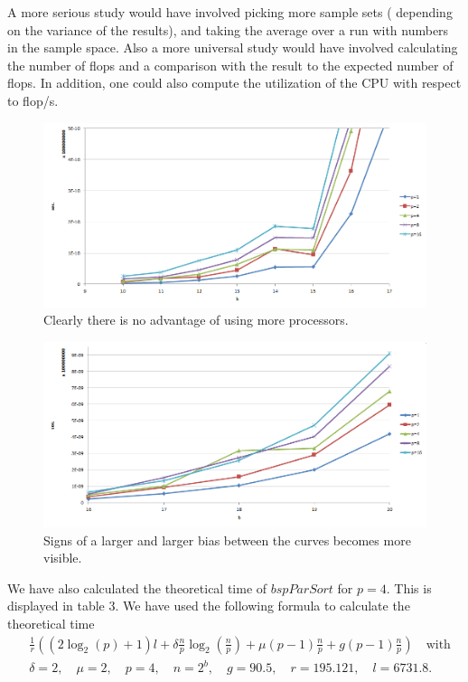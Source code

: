 \documentclass[a4paper,12pt,article]{memoir}
\theoremstyle{plain}
\theoremstyle{definition}
\theoremstyle{remark}
\theoremstyle{plain}
\theoremstyle{remark}
\begin{document}
A more serious study would have involved picking more sample sets ( depending on the variance of the results), and taking the average over a run with numbers in the sample space. Also a more universal study would have involved calculating the number of flops and a comparison with the result to the expected number of flops. In addition, one could also compute the utilization of the CPU with respect to flop/s. 
\begin{figure}[hbtp]
\centering
\includegraphics[scale=0.65]{exp1.png}
\caption{Clearly there is no advantage of using more processors.}
\end{figure}

\begin{figure}[hbtp]
\centering
\includegraphics[scale=0.65]{exp2.png}
\caption{Signs of a larger and larger bias between the curves becomes more visible.}
\end{figure}

We have also calculated the theoretical time of $bspParSort$ for $p=4$. This is displayed in table 3. We have used the following formula to calculate the theoretical time 
\begin{align*}
&\frac{1}{r}\left((2\log_2(p)+1)l+\delta\frac{n}{p}\log_2\left(\frac{n}{p}\right)+\mu(p-1)\frac{n}{p}+g(p-1)\frac{n}{p}\right)\quad \mbox{with} \\
&\delta=2,\quad \mu=2,\quad p=4, \quad n=2^b,\quad g=90.5,\quad r=195.121,\quad l=6731.8.
\end{align*}
\end{document}
